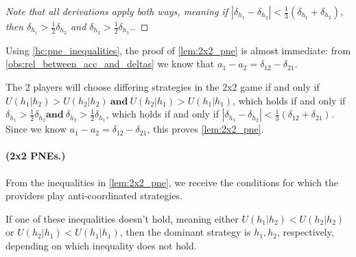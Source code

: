 \begin{proof}
[Note that all derivations apply both ways, meaning if $|\delta_{h_1} - \delta_{h_2} |< \frac{1}{3}(\delta_{h_1} + \delta_{h_2})$, then  $\delta_{h_1} > \frac{1}{2}\delta_{h_2}$ and $\delta_{h_2} > \frac{1}{2}\delta_{h_1}$.]

\end{proof}

Using \cref{hc:pne_inequalities}, the proof of \cref{lem:2x2_pne} is almost immediate:
from \cref{obs:rel_between_acc_and_deltas} we know that $a_1 - a_2 = \delta_{12} - \delta_{21}$.

The 2 players will choose differing strategies in the 2x2 game if and only if
$U(h_1|h_2) > U(h_2|h_2) \ \textbf{and} \ U(h_2|h_1) > U(h_1|h_1)$, which holds if and only if $\delta_{h_1} > \frac{1}{2}\delta_{h_2} \textbf{and} \ \delta_{h_2} > \frac{1}{2}\delta_{h_1}$, which holds if and only if $|\delta_{h_1} - \delta_{h_2}| < \frac{1}{3}(\delta_{12}+\delta_{21})$.
Since we know $a_1 - a_2 = \delta_{12} - \delta_{21}$, this proves \cref{lem:2x2_pne}.

\paragraph{ (2x2 PNEs.)}
From the inequalities in \cref{lem:2x2_pne}, we receive the conditions for which the providers play anti-coordinated strategies.

If one of these inequalities doesn't hold, meaning either $U(h_1|h_2) < U(h_2|h_2)$ or $U(h_2|h_1) < U(h_1|h_1)$, then the dominant strategy is $h_1,h_2$, respectively, depending on which inequality does not hold.
